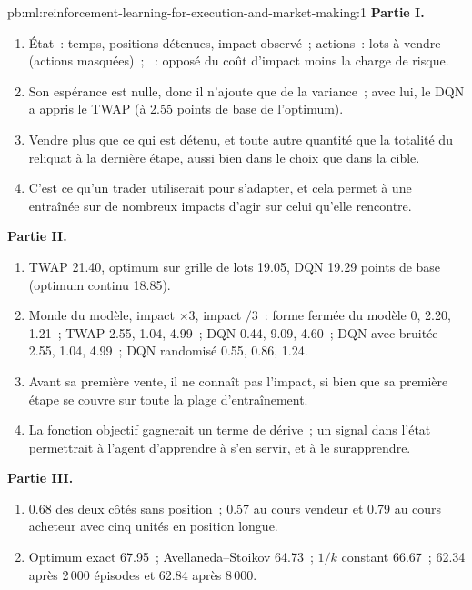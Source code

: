 \begin{solution}{pb:ml:reinforcement-learning-for-execution-and-market-making:1}
\textbf{Partie I.}
\begin{enumerate}
\item État~: temps, positions détenues, impact observé~; actions~: lots à vendre (actions masquées)~; ~: opposé du coût d'impact moins la charge de risque.
\item Son espérance est nulle, donc il n'ajoute que de la variance~; avec lui, le DQN a appris le TWAP (à 2.55 points de base de l'optimum).
\item Vendre plus que ce qui est détenu, et toute autre quantité que la totalité du reliquat à la dernière étape, aussi bien dans le choix que dans la cible.
\item C'est ce qu'un trader utiliserait pour s'adapter, et cela permet à une  entraînée sur de nombreux impacts d'agir sur celui qu'elle rencontre.
\end{enumerate}
\textbf{Partie II.}
\begin{enumerate}[resume]
\item TWAP 21.40, optimum sur grille de lots 19.05, DQN 19.29 points de base (optimum continu 18.85).
\item Monde du modèle, impact $\times3$, impact $/3$~: forme fermée du modèle 0, 2.20, 1.21~; TWAP 2.55, 1.04, 4.99~; DQN 0.44, 9.09,
4.60~; DQN avec  bruitée 2.55, 1.04, 4.99~; DQN randomisé 0.55, 0.86, 1.24.
\item Avant sa première vente, il ne connaît pas l'impact, si bien que sa première étape se couvre sur toute la plage d'entraînement.
\item La fonction objectif gagnerait un terme de dérive~; un signal dans l'état permettrait à l'agent d'apprendre à s'en servir, et à
le surapprendre.
\end{enumerate}
\textbf{Partie III.}
\begin{enumerate}[resume]
\item 0.68 des deux côtés sans position~; 0.57 au cours vendeur et 0.79 au cours acheteur avec cinq unités en position longue.
\item Optimum exact 67.95~; Avellaneda--Stoikov 64.73~; $1/k$ constant 66.67~;  62.34 après 2\,000 épisodes et 62.84
après 8\,000.

\end{enumerate}
\end{solution}
